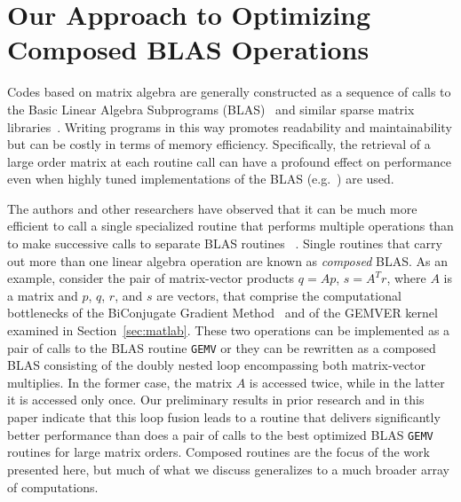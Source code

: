 \documentclass[runningheads]{llncs}
\begin{document}
\section{Our Approach to Optimizing Composed BLAS Operations}
\label{sec:approach}


Codes based on matrix algebra are generally constructed as a sequence of calls to the Basic Linear Algebra Subprograms (BLAS)~\cite{Dongarra:1988uq,Lawson:1979kx,Dongarra:1990fk} and similar sparse matrix libraries~\cite{Saad:fr,George:1981uq}. Writing programs in this way promotes readability and maintainability but can be costly in terms of memory efficiency. Specifically, the retrieval of a large order matrix at each routine call can have a profound effect on performance even when highly tuned implementations of the BLAS (e.g.~\cite{Bilmes:1997ye,Whaley:1998fk,IntelMath:oq,ESSL:kl,Goto:2006fk}) are used.

The authors and other researchers have observed that it can be much more efficient to call a single specialized routine that performs multiple operations than to make successive calls to separate BLAS routines ~\cite{Ashby:uq,Blackford:2002vn,baker03blgmres,baker03lgmres,Dennis:2005tg,Howell:2008,gropp01,Vuduc:2003kl}.  Single routines that carry out more than one linear algebra operation are known as \emph{composed} BLAS. As an example, consider the pair of matrix-vector products $q  = Ap$, $s  = A^Tr$, where $A$ is a matrix and $p$, $q$, $r$, and $s$ are vectors, that comprise the computational
bottlenecks of the BiConjugate Gradient Method~\cite{Barrett:1994kx,Saad:2003fk}  and of the GEMVER kernel examined in Section~\ref{sec:matlab}.   These two operations can be implemented as a pair of calls to the BLAS routine {\tt GEMV} or they can be rewritten as a composed BLAS consisting of the doubly nested loop encompassing both matrix-vector multiplies. In the former case, the matrix $A$ is accessed twice, while in the latter it is accessed only once. Our preliminary results in prior research and in this paper indicate that this loop fusion leads to a routine that delivers significantly better performance than does a pair of calls to the best optimized BLAS {\tt GEMV} routines for large matrix orders.
Composed routines are the focus of the work presented here, but much of what we discuss generalizes to a much broader array of computations.  
\end{document}

